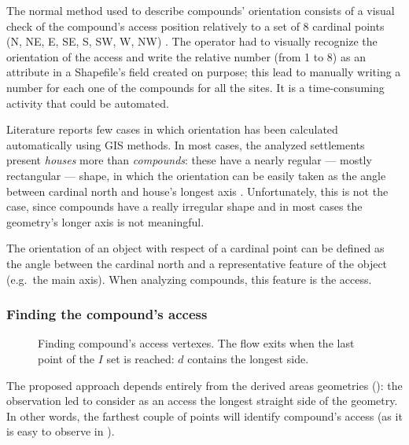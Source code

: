             The normal method used to describe compounds' orientation consists of a visual check of the compound's access position relatively to a set of 8 cardinal points (N, NE, E, SE, S, SW, W, NW) \cite{laterza}. The operator had to visually recognize the orientation of the access and write the relative number (from 1 to 8) as an attribute in a Shapefile's field created on purpose; this lead to manually writing a number for each one of the compounds for all the sites. It is a time-consuming activity that could be automated.

            Literature reports few cases in which orientation has been calculated automatically using GIS methods. In most cases, the analyzed settlements present \emph{houses} more than \emph{compounds}: these have a nearly regular --- mostly rectangular --- shape, in which the orientation can be easily taken as the angle between cardinal north and house's longest axis \cite[p.~53]{spatial-south-europe}. Unfortunately, this is not the case, since compounds have a really irregular shape and in most cases the geometry's longer axis is not meaningful.

            The orientation of an object with respect of a cardinal point can be defined as the angle between the cardinal north and a representative feature of the object (e.g.\ the main axis). When analyzing compounds, this feature is the access.
            \subsubsection{Finding the compound's access}
                \begin{wrapfigure}{r}{0.45\textwidth}
                    \vspace{-0.08\textheight}
                    \centering
                    \begin{tikzpicture}[x=1mm,y=1mm,scale=0.005]
                        
                    \end{tikzpicture}
                    \caption[Logic process to determine the compound's access.]{Finding compound's access vertexes. The flow exits when the last point of the $I$ set is reached: $d$ contains the longest side.}
                    \label{fig:flow-access}
                    \vspace{-0.04\textheight}
                \end{wrapfigure}

                The proposed approach depends entirely from the derived areas geometries (): the observation led to consider as an access the longest straight side of the geometry. In other words, the farthest couple of points will identify compound's access (as it is easy to observe in ).
                
